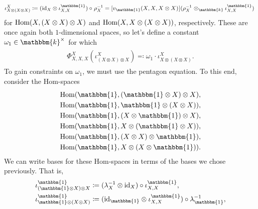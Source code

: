 \begin{example}
\begin{align*}
\begin{split}
\end{split}
\end{align*}
\begin{align*}
\begin{split}
\iota_{X \otimes (X \otimes X)}^X \coloneqq (\id_X \otimes \iota_{X,X}^{{\mathbbm{1}}}) \circ \hphantom{\lambda}\nhphantom{$\rho$}\rho_X^{-1} = [v_{{\mathbbm{1}}}(X, X, X \otimes X)\hphantom{u}\nhphantom{$v$}](\rho_X^{-1}\hphantom{\lambda}\nhphantom{$\rho$} \otimes_\mathbbm{k} \iota_{X,X}^{{\mathbbm{1}}})\hphantom{,}
\end{split}
\end{align*}
\noindent for $\textup{Hom}(X, (X \otimes X) \otimes X)$ and $\textup{Hom}(X, X \otimes (X \otimes X))$, respectively. These are once again both $1$-dimensional spaces, so let's define a constant $\omega_1 \in \mathbbm{k}^\times$ for which
\begin{align*}
\begin{split}
\Phi_{X,X,X}^X(\iota_{(X \otimes X) \otimes X}^X) \eqqcolon \omega_1 \cdot \iota_{X \otimes (X \otimes X)}^X.
\end{split}
\end{align*}
\noindent To gain constraints on $\omega_1$, we must use the pentagon equation. To this end, consider the Hom-spaces
\begin{align*}
\begin{split}
\homset({\mathbbm{1}}, ({\mathbbm{1}} \otimes X) \otimes X),\\
\homset({\mathbbm{1}}, {\mathbbm{1}} \otimes (X \otimes X)),\\
\homset({\mathbbm{1}}, (X \otimes {\mathbbm{1}}) \otimes X),\\
\homset({\mathbbm{1}}, X \otimes ({\mathbbm{1}} \otimes X)),\\
\homset({\mathbbm{1}}, (X \otimes X) \otimes {\mathbbm{1}}),\\
\homset({\mathbbm{1}}, X \otimes (X \otimes {\mathbbm{1}})).
\end{split}
\end{align*}
\newpage
\noindent We can write bases for these Hom-spaces in terms of the bases we chose previously. That is,
\begin{align*}
\begin{split}
\iota_{({\mathbbm{1}} \otimes X) \otimes X}^{\mathbbm{1}} &\coloneqq (\lambda_X^{-1} \otimes \id_X) \circ \iota_{X,X}^{{\mathbbm{1}}},\\
\iota_{{\mathbbm{1}} \otimes (X \otimes X)}^{\mathbbm{1}} &\coloneqq (\id_{\mathbbm{1}} \otimes \iota_{X,X}^{{\mathbbm{1}}}) \circ \lambda_{\mathbbm{1}}^{-1},\\

\end{split}
\end{align*}
\end{example}
